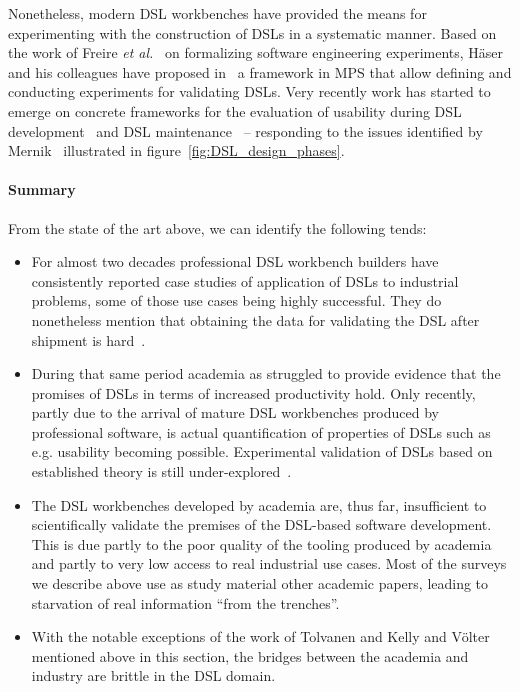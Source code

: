 \documentclass{scrartcl}
\begin{document}
Nonetheless, modern DSL workbenches have provided the means for experimenting
with the construction of DSLs in a systematic manner. Based on the work of
Freire \emph{et al.}~\cite{Freire14} on formalizing software engineering
experiments, H\"aser and his colleagues have proposed in~\cite{Haser16} a
framework in MPS that allow defining and conducting experiments for validating
DSLs. Very recently work has started to emerge on concrete frameworks for the
evaluation of usability during DSL development~\cite{Barisic18} and DSL
maintenance~\cite{ThanhoferPilisch17} -- responding to the issues identified by
Mernik~\cite{Mernik17} illustrated in figure~\ref{fig:DSL_design_phases}.

\paragraph{Summary}
From the state of the art above, we can identify the following tends:

\begin{itemize}
  \item For almost two decades professional DSL workbench builders have
  consistently reported case studies of application of DSLs to industrial
  problems, some of those use cases being highly successful.
  They do nonetheless mention that obtaining the data for validating the DSL
  after shipment is hard~\cite{Tolvanen018}.
  \item During that same period academia as struggled to provide evidence that
  the promises of DSLs in terms of increased productivity hold. Only recently,
  partly due to the arrival of mature DSL workbenches produced by professional
  software, is actual quantification of properties of DSLs such as e.g.
  usability becoming possible. Experimental validation of DSLs based on
  established theory is still under-explored~\cite{Mernik17}.
  \item The DSL workbenches developed by academia are, thus far, insufficient to
  scientifically validate the premises of the DSL-based software development.
  This is due partly to the poor quality of the tooling
  produced by academia~\cite{TolvanenKelly2016} and partly to very low access to
  real industrial use cases. Most of the surveys we describe above use as study
  material other academic papers, leading to starvation of real information
  ``from the trenches''.
  \item With the notable exceptions of the work of Tolvanen and Kelly and
  Völter mentioned above in this section, the bridges between the academia and
  industry are brittle in the DSL domain.
\end{itemize}
\end{document}
